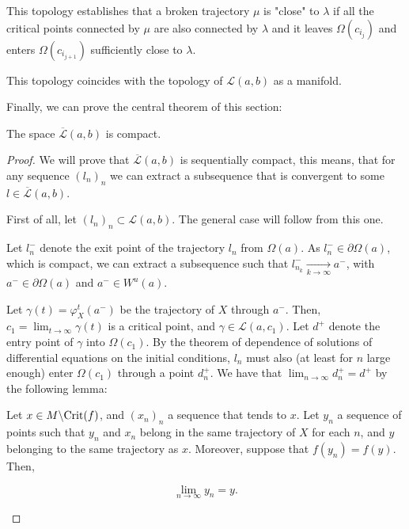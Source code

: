 This topology establishes that a broken trajectory $\mu$ is "close" to $\lambda$ if all the critical points connected by $\mu$ are also connected by $\lambda$ and it leaves $\Omega(c_{i_j})$ and enters $\Omega(c_{i_{j+1}})$ sufficiently close to $\lambda$.

\begin{rmrk}
This topology coincides with the topology of $\mathcal{L}(a,b)$ as a manifold.
\end{rmrk}

Finally, we can prove the central theorem of this section:

\begin{theo}
The space $\overline{\mathcal{L}}(a,b)$ is compact.
\end{theo}

\begin{proof}
We will prove that $\overline{\mathcal{L}}(a,b)$ is sequentially compact, this means, that for any sequence $(l_n)_n$ we can extract a subsequence that is convergent to some $l \in \overline{\mathcal{L}}(a,b)$.

First of all, let $(l_n)_n \subset \mathcal{L}(a,b)$. The general case will follow from this one.

Let $l_n^{-}$ denote the exit point of the trajectory $l_n$ from $\Omega(a)$. As $l_n^- \in \partial \Omega(a)$, which is compact, we can extract a subsequence such that $l_{n_k}^- \xrightarrow[k \rightarrow \infty]{} a^-$, with $a^- \in \partial \Omega(a)$ and $a^- \in W^u(a)$.

Let $\gamma(t) = \varphi^t_X(a^-)$ be the trajectory of $X$ through $a^-$. Then, $c_1 = \displaystyle\lim_{t \rightarrow \infty} \gamma(t)$ is a critical point, and $\gamma \in \mathcal{L}(a,c_1)$. Let $d^+$ denote the entry point of $\gamma$ into $\Omega(c_1)$. By the theorem of dependence of solutions of differential equations on the initial conditions, $l_n$ must also (at least for $n$ large enough) enter $\Omega(c_1)$ through a point $d_n^+$. We have that $\displaystyle\lim_{n \rightarrow \infty} d_n^+ = d^+$ by the following lemma:

\begin{lema}
Let $x \in M \backslash \text{Crit}(f)$, and $(x_n)_n$ a sequence that tends to $x$. Let $y_n$ a sequence of points such that $y_n$ and $x_n$ belong in the same trajectory of $X$ for each $n$, and $y$ belonging to the same trajectory as $x$. Moreover, suppose that $f(y_n) = f(y)$. Then,

$$\lim_{n \rightarrow \infty} y_n = y .$$
\end{lema}


\end{proof}
